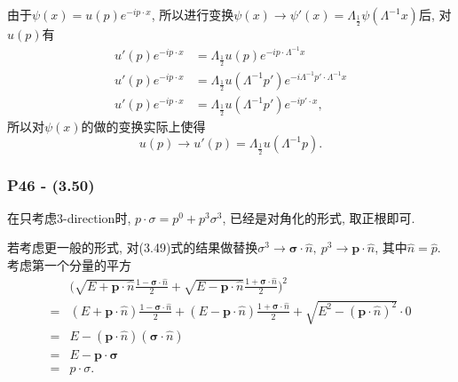 \documentclass[cn,hazy,blue,11pt,device=normal,chinesefont=founder]{elegantnote}
\begin{document}
\begin{enumerate}
\begin{note}
    由于$\psi(x) = u(p)e^{-ip\cdot x}$, 所以进行变换$\psi(x) \rightarrow \psi'(x) = \Lambda_{\frac{1}{2}}\psi(\Lambda^{-1}x)$后, 对$u(p)$有
    \begin{equation}
      \begin{aligned}
        u'(p)e^{-ip\cdot x} &= \Lambda_{\frac{1}{2}}u(p)e^{-ip\cdot \Lambda^{-1}x} \\
        u'(p)e^{-ip\cdot x} &= \Lambda_{\frac{1}{2}}u(\Lambda^{-1}p')e^{-i\Lambda^{-1}p'\cdot \Lambda^{-1}x} \\
        u'(p)e^{-ip\cdot x} &= \Lambda_{\frac{1}{2}}u(\Lambda^{-1}p')e^{-ip'\cdot x}, 
      \end{aligned}
    \end{equation}
    所以对$\psi(x)$的做的变换实际上使得
    \begin{equation}
      u(p) \rightarrow u'(p) = \Lambda_{\frac{1}{2}}u(\Lambda^{-1}p). 
    \end{equation}
  \end{note}
\end{enumerate}

\subsubsection{P46 - (3.50)}

在只考虑3-direction时, $p\cdot \sigma = p^0 + p^3\sigma^3$, 已经是对角化的形式, 取正根即可. 

若考虑更一般的形式, 对(3.49)式的结果做替换$\sigma^3 \rightarrow \boldsymbol{\sigma}\cdot\hat{n},\ p^3 \rightarrow \mathbf{p}\cdot\hat{n}$, 其中$\hat{n} = \hat{p}$. 考虑第一个分量的平方
\begin{equation}
  \begin{aligned}
    &\biggl(\sqrt{E+\mathbf{p}\cdot\hat{n}} \frac{1-\boldsymbol{\sigma}\cdot\hat{n}}{2} + \sqrt{E-\mathbf{p}\cdot\hat{n}} \frac{1+\boldsymbol{\sigma}\cdot\hat{n}}{2} \biggr)^2 \\ 
    =& (E+\mathbf{p}\cdot\hat{n}) \frac{1-\boldsymbol{\sigma}\cdot\hat{n}}{2} + (E-\mathbf{p}\cdot\hat{n}) \frac{1+\boldsymbol{\sigma}\cdot\hat{n}}{2} + \sqrt{E^2 - (\mathbf{p}\cdot\hat{n})^2} \cdot 0 \\
    =& E - (\mathbf{p}\cdot\hat{n})(\boldsymbol{\sigma}\cdot\hat{n}) \\
    =& E - \mathbf{p} \cdot \boldsymbol{\sigma} \\
    =& p \cdot \sigma .
  \end{aligned}
\end{equation}
\end{document}
